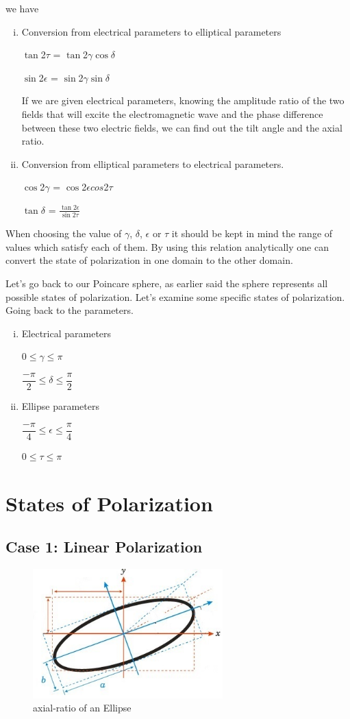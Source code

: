 we have 
\begin{enumerate}[(i)]
\item Conversion from electrical parameters to elliptical parameters

$\tan$2$\tau$ = $\tan$2$\gamma$$\cos$$\delta$

$\sin$2$\epsilon$ = $\sin$2$\gamma$$\sin$$\delta$

If we are given electrical parameters, knowing the amplitude ratio of the two fields that will excite the electromagnetic wave and the phase difference between these two electric fields, we can find out the tilt angle and the axial ratio.
\item Conversion from elliptical parameters to electrical parameters.

$\cos$2$\gamma$ = $\cos$2$\epsilon$$cos$2$\tau$

$\tan$$\delta$	= $\frac{\tan2\epsilon}{\sin2\tau}$
\end{enumerate}
When choosing the value of $\gamma$, $\delta$, $\epsilon$ or $\tau$ it should be kept in mind the range of values which satisfy each of them. By using this relation analytically one can convert the state of polarization in one domain to the other domain.

Let's go back to our Poincare sphere, as earlier said the sphere represents all possible states of polarization. Let's examine some specific states of polarization. Going back to the parameters.
\begin{enumerate}[(i)]
\item Electrical parameters 

0$\leq$$\gamma$$\leq$$\pi$

$\dfrac{-\pi}{2}$$\leq$$\delta$$\leq$$\dfrac{\pi}{2}$
\item Ellipse parameters

$\dfrac{-\pi}{4}$$\leq$$\epsilon$$\leq$$\dfrac{\pi}{4}$

0$\leq$$\tau$$\leq$$\pi$
\end{enumerate}

\section{States of Polarization}
\subsection{Case 1: Linear Polarization}

\begin{figure}[h]
\centering
\includegraphics[height=5cm]{"./graphics/axial ratio"}
\caption{axial-ratio of an Ellipse}
\label{fig:axial-ratio}
\end{figure}

